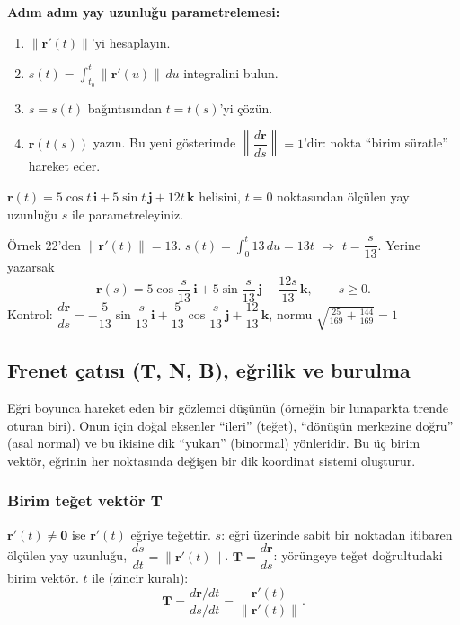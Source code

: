 \textbf{Adım adım yay uzunluğu parametrelemesi:}
\begin{enumerate}
\item $\|\mathbf r'(t)\|$'yi hesaplayın.
\item $s(t)=\int_{t_0}^t\|\mathbf r'(u)\|\,du$ integralini bulun.
\item $s=s(t)$ bağıntısından $t=t(s)$'yi çözün.
\item $\mathbf r(t(s))$ yazın. Bu yeni gösterimde $\left\|\dfrac{d\mathbf r}{ds}\right\|=1$'dir: nokta ``birim süratle'' hareket eder.
\end{enumerate}

\begin{soru}
$\mathbf r(t)=5\cos t\,\mathbf i+5\sin t\,\mathbf j+12t\,\mathbf k$ helisini, $t=0$ noktasından ölçülen yay uzunluğu $s$ ile parametreleyiniz.
\end{soru}
\begin{cevap}
Örnek 22'den $\|\mathbf r'(t)\|=13$. $s(t)=\int_0^t13\,du=13t$ $\Rightarrow$ $t=\dfrac{s}{13}$. Yerine yazarsak
\[ \mathbf r(s)=5\cos\frac{s}{13}\,\mathbf i+5\sin\frac{s}{13}\,\mathbf j+\frac{12s}{13}\,\mathbf k,\qquad s\ge0 . \]
Kontrol: $\dfrac{d\mathbf r}{ds}=-\dfrac5{13}\sin\dfrac s{13}\,\mathbf i+\dfrac5{13}\cos\dfrac s{13}\,\mathbf j+\dfrac{12}{13}\,\mathbf k$,
normu $\sqrt{\frac{25}{169}+\frac{144}{169}}=1$ \checkmark
\end{cevap}

\subsection{Frenet çatısı (T, N, B), eğrilik ve burulma}

Eğri boyunca hareket eden bir gözlemci düşünün (örneğin bir lunaparkta trende oturan biri). Onun için doğal eksenler
``ileri'' (teğet), ``dönüşün merkezine doğru'' (asal normal) ve bu ikisine dik ``yukarı'' (binormal) yönleridir. Bu üç birim
vektör, eğrinin her noktasında değişen bir dik koordinat sistemi oluşturur.

\subsubsection{Birim teğet vektör \texorpdfstring{$\mathbf T$}{T}}

\begin{tahta}
$\mathbf r'(t)\neq\mathbf 0$ ise $\mathbf r'(t)$ eğriye teğettir. $s$: eğri üzerinde sabit bir noktadan itibaren ölçülen yay uzunluğu,
$\dfrac{ds}{dt}=\|\mathbf r'(t)\|$. \quad $\mathbf T=\dfrac{d\mathbf r}{ds}$: yörüngeye teğet doğrultudaki birim vektör. $t$ ile (zincir kuralı):
\[ \mathbf T=\frac{d\mathbf r/dt}{ds/dt}=\frac{\mathbf r'(t)}{\|\mathbf r'(t)\|} . \]
\end{tahta}

